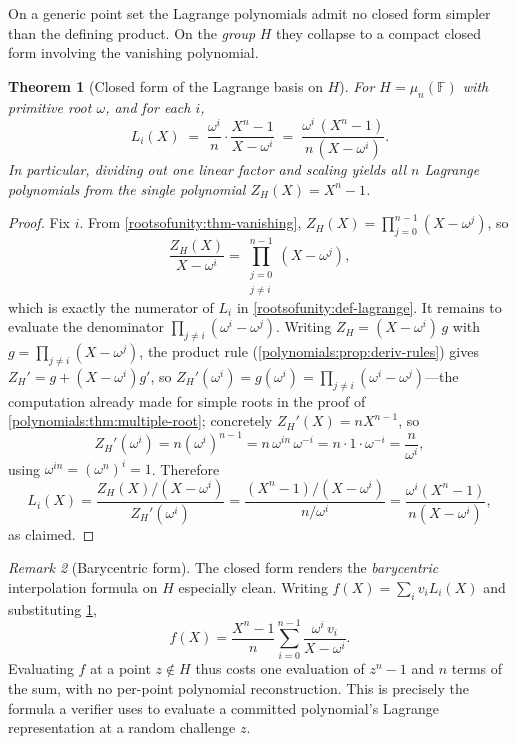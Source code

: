 \documentclass[11pt,a4paper]{article}
\newtheorem{theorem}{Theorem}[section]
\theoremstyle{definition}
\theoremstyle{remark}
\newtheorem{remark}[theorem]{Remark}
\newcommand{\F}{\ensuremath{\mathbb{F}}}
\begin{document}
On a generic point set the Lagrange polynomials admit no closed form simpler than the defining product. On the \emph{group} \(H\) they collapse to a compact closed form involving the vanishing polynomial.

\begin{theorem}[Closed form of the Lagrange basis on \(H\)]\label{rootsofunity:thm-lagrangeclosed}
For \(H = \mu_n(\F)\) with primitive root \(\omega\), and for each \(i\),
\[
  L_i(X) \;=\; \frac{\omega^i}{n}\cdot\frac{X^n - 1}{X - \omega^i}
  \;=\; \frac{\omega^i\,(X^n-1)}{n\,(X-\omega^i)}.
\]
In particular, dividing out one linear factor and scaling yields all \(n\) Lagrange polynomials from the \emph{single} polynomial \(Z_H(X) = X^n - 1\).
\end{theorem}

\begin{proof}
Fix \(i\). From \cref{rootsofunity:thm-vanishing}, \(Z_H(X) = \prod_{j=0}^{n-1}(X-\omega^j)\), so
\[
  \frac{Z_H(X)}{X-\omega^i} = \prod_{\substack{j=0\\ j\ne i}}^{n-1}(X - \omega^j),
\]
which is exactly the numerator of \(L_i\) in \cref{rootsofunity:def-lagrange}. It remains to evaluate the denominator \(\prod_{j\ne i}(\omega^i-\omega^j)\). Writing \(Z_H = (X-\omega^i)\,g\) with \(g = \prod_{j\ne i}(X-\omega^j)\), the product rule (\cref{polynomials:prop:deriv-rules}) gives \(Z_H' = g + (X-\omega^i)g'\), so \(Z_H'(\omega^i) = g(\omega^i) = \prod_{j\ne i}(\omega^i-\omega^j)\)---the computation already made for simple roots in the proof of \cref{polynomials:thm:multiple-root}; concretely \(Z_H'(X) = nX^{n-1}\), so
\[
  Z_H'(\omega^i) = n(\omega^i)^{n-1} = n\,\omega^{i n}\,\omega^{-i} = n\cdot 1\cdot \omega^{-i} = \frac{n}{\omega^i},
\]
using \(\omega^{in} = (\omega^n)^i = 1\). Therefore
\[
  L_i(X) = \frac{Z_H(X)/(X-\omega^i)}{Z_H'(\omega^i)} = \frac{(X^n-1)/(X-\omega^i)}{n/\omega^i} = \frac{\omega^i(X^n-1)}{n(X-\omega^i)},
\]
as claimed.
\end{proof}

\begin{remark}[Barycentric form]\label{rootsofunity:rem-barycentric}
The closed form renders the \emph{barycentric} interpolation formula on \(H\) especially clean. Writing \(f(X) = \sum_i v_i L_i(X)\) and substituting \cref{rootsofunity:thm-lagrangeclosed},
\[
  f(X) = \frac{X^n-1}{n}\sum_{i=0}^{n-1}\frac{\omega^i\,v_i}{X - \omega^i}.
\]
Evaluating \(f\) at a point \(z \notin H\) thus costs one evaluation of \(z^n-1\) and \(n\) terms of the sum, with no per-point polynomial reconstruction. This is precisely the formula a verifier uses to evaluate a committed polynomial's Lagrange representation at a random challenge \(z\).
\end{remark}
\end{document}
